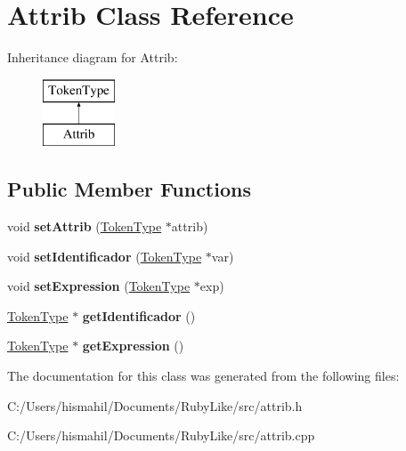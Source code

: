 \hypertarget{class_attrib}{\section{Attrib Class Reference}
\label{class_attrib}
}
Inheritance diagram for Attrib\-:\begin{figure}[H]
\begin{center}
\leavevmode
\includegraphics[height=2.000000cm]{class_attrib}
\end{center}
\end{figure}
\subsection*{Public Member Functions}
\begin{DoxyCompactItemize}
\item 
\hypertarget{class_attrib_af692b350ad68af49ac64681c1dd37190}{void {\bfseries set\-Attrib} (\hyperlink{class_token_type}{Token\-Type} $\ast$attrib)}\label{class_attrib_af692b350ad68af49ac64681c1dd37190}

\item 
\hypertarget{class_attrib_a2a795723e18599ca9da17c5af3716748}{void {\bfseries set\-Identificador} (\hyperlink{class_token_type}{Token\-Type} $\ast$var)}\label{class_attrib_a2a795723e18599ca9da17c5af3716748}

\item 
\hypertarget{class_attrib_a2ca1acd5c5ecb8f742ab288d5545bd52}{void {\bfseries set\-Expression} (\hyperlink{class_token_type}{Token\-Type} $\ast$exp)}\label{class_attrib_a2ca1acd5c5ecb8f742ab288d5545bd52}

\item 
\hypertarget{class_attrib_af4d373afcd2308d759dce8e86aeafc00}{\hyperlink{class_token_type}{Token\-Type} $\ast$ {\bfseries get\-Identificador} ()}\label{class_attrib_af4d373afcd2308d759dce8e86aeafc00}

\item 
\hypertarget{class_attrib_a2d3205310c06bec606d817f6f80d9289}{\hyperlink{class_token_type}{Token\-Type} $\ast$ {\bfseries get\-Expression} ()}\label{class_attrib_a2d3205310c06bec606d817f6f80d9289}

\end{DoxyCompactItemize}


The documentation for this class was generated from the following files\-:\begin{DoxyCompactItemize}
\item 
C\-:/\-Users/hismahil/\-Documents/\-Ruby\-Like/src/attrib.\-h\item 
C\-:/\-Users/hismahil/\-Documents/\-Ruby\-Like/src/attrib.\-cpp\end{DoxyCompactItemize}
